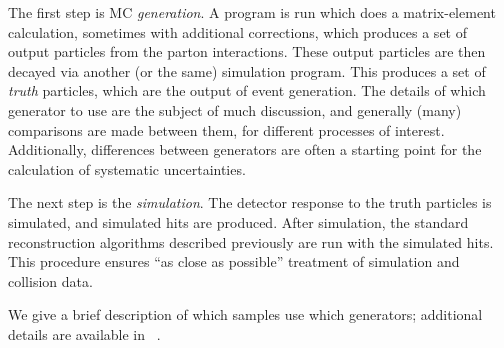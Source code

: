 The first step is MC \textit{generation}.
A program is run which does a matrix-element calculation, sometimes with additional corrections, which produces a set of output particles from the parton interactions.
These output particles are then decayed via another (or the same) simulation program.
This produces a set of \textit{truth} particles, which are the output of event generation.
The details of which generator to use are the subject of much discussion, and generally (many) comparisons are made between them, for different processes of interest.
Additionally, differences between generators are often a starting point for the calculation of systematic uncertainties.

The next step is the \textit{simulation}.
The detector response to the truth particles is simulated, and simulated hits are produced.
After simulation, the standard reconstruction algorithms described previously are run with the simulated hits.
This procedure ensures ``as close as possible'' treatment of simulation and collision data.

We give a brief description of which samples use which generators; additional details are available in ~\cite{ATLAS-CONF-2016-078}.

